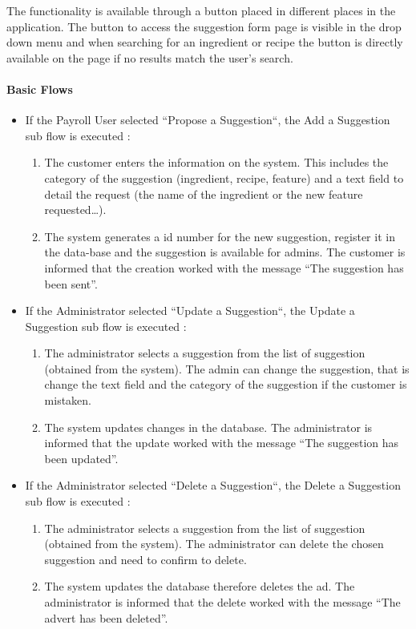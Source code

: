{
  The functionality is available through a button placed in different places in the application. The button to access the suggestion form page is visible in the drop down menu and when searching for an ingredient or recipe the button is directly available on the page if no results match the user's search.

  \paragraph{Basic Flows}
  \begin{itemize}
    \item If the Payroll User selected “Propose a Suggestion“, the Add a Suggestion sub flow is executed :
    \begin{enumerate}
      \item The customer enters the information on the system. This includes the category of the suggestion (ingredient, recipe, feature) and a text field to detail the request (the name of the ingredient or the new feature requested\dots).
      \item The system generates a id number for the new suggestion, register it in the data-base and the suggestion is available for admins. The customer is informed that the creation worked with the message “The suggestion has been sent”.
    \end{enumerate}
    \item If the Administrator selected “Update a Suggestion“, the Update a Suggestion sub flow is executed :
    \begin{enumerate}
      \item The administrator selects a suggestion from the list of suggestion (obtained from the system). The admin can change the suggestion, that is change the text field and the category of the suggestion if the customer is mistaken.
      \item The system updates changes in the database. The administrator is informed that the update worked with the message “The suggestion has been updated”.
    \end{enumerate}
    \item If the Administrator selected “Delete a Suggestion“, the Delete a Suggestion sub flow is executed :
    \begin{enumerate}
      \item The administrator selects a suggestion from the list of suggestion (obtained from the system). The administrator can delete the chosen suggestion and need to confirm to delete.
      \item The system updates the database therefore deletes the ad. The administrator is informed that the delete worked with the message “The advert has been deleted”.
    \end{enumerate}
  \end{itemize}

}
